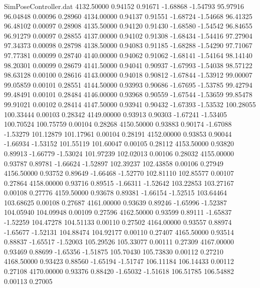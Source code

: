 \begin{filecontents}{SimPoseController.dat}
4132.50000    0.94152    0.91671    -1.68868   -1.54793   95.97916   96.04848    0.00096    0.28960
4134.00000    0.94137    0.91551    -1.68724   -1.54668   96.41325   96.48102    0.00097    0.28908
4135.50000    0.94120    0.91430    -1.68580   -1.54542   96.84655   96.91279    0.00097    0.28855
4137.00000    0.94102    0.91308    -1.68434   -1.54416   97.27904   97.34373    0.00098    0.28798
4138.50000    0.94083    0.91185    -1.68288   -1.54290   97.71067   97.77381    0.00099    0.28740
4140.00000    0.94062    0.91062    -1.68141   -1.54164   98.14140   98.20301    0.00099    0.28679
4141.50000    0.94041    0.90937    -1.67993   -1.54038   98.57122   98.63128    0.00100    0.28616
4143.00000    0.94018    0.90812    -1.67844   -1.53912   99.00007   99.05859    0.00101    0.28551
4144.50000    0.93993    0.90686    -1.67695   -1.53785   99.42794   99.48491    0.00101    0.28484
4146.00000    0.93968    0.90559    -1.67544   -1.53659   99.85478   99.91021    0.00102    0.28414
4147.50000    0.93941    0.90432    -1.67393   -1.53532  100.28055  100.33444    0.00103    0.28342
4149.00000    0.93913    0.90303    -1.67241   -1.53405  100.70524  100.75759    0.00104    0.28268
4150.50000    0.93883    0.90174    -1.67088   -1.53279  101.12879  101.17961    0.00104    0.28191
4152.00000    0.93853    0.90044    -1.66934   -1.53152  101.55119  101.60047    0.00105    0.28112
4153.50000    0.93820    0.89913    -1.66779   -1.53024  101.97239  102.02013    0.00106    0.28032
4155.00000    0.93787    0.89781    -1.66624   -1.52897  102.39237  102.43858    0.00106    0.27949
4156.50000    0.93752    0.89649    -1.66468   -1.52770  102.81110  102.85577    0.00107    0.27864
4158.00000    0.93716    0.89515    -1.66311   -1.52642  103.22853  103.27167    0.00108    0.27776
4159.50000    0.93678    0.89381    -1.66154   -1.52515  103.64464  103.68625    0.00108    0.27687
4161.00000    0.93639    0.89246    -1.65996   -1.52387  104.05940  104.09948    0.00109    0.27596
4162.50000    0.93599    0.89111    -1.65837   -1.52259  104.47278  104.51133    0.00110    0.27502
4164.00000    0.93557    0.88974    -1.65677   -1.52131  104.88474  104.92177    0.00110    0.27407
4165.50000    0.93514    0.88837    -1.65517   -1.52003  105.29526  105.33077    0.00111    0.27309
4167.00000    0.93469    0.88699    -1.65356   -1.51875  105.70430  105.73830    0.00112    0.27210
4168.50000    0.93423    0.88560    -1.65194   -1.51747  106.11184  106.14433    0.00112    0.27108
4170.00000    0.93376    0.88420    -1.65032   -1.51618  106.51785  106.54882    0.00113    0.27005

\end{filecontents}
